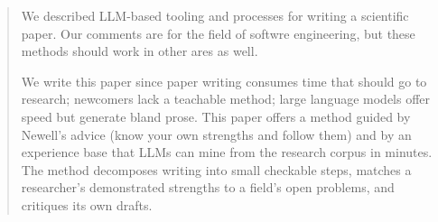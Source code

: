 \begin{abstract}
  We described LLM-based tooling and processes for writing a scientific
  paper. 
  Our comments are for the field of softwre engineering, but these methods should work in other ares as well.

We write this paper since paper writing consumes time that should go to research; newcomers lack
a teachable method; large language models offer speed but generate
bland prose.
This paper offers a method guided by Newell's advice (know your own
strengths and follow them) and by an experience base that LLMs can
mine from the research corpus in minutes.
The method decomposes writing into small checkable steps, matches a
researcher's demonstrated strengths to a field's open problems, and
critiques its own drafts.
\end{abstract}
